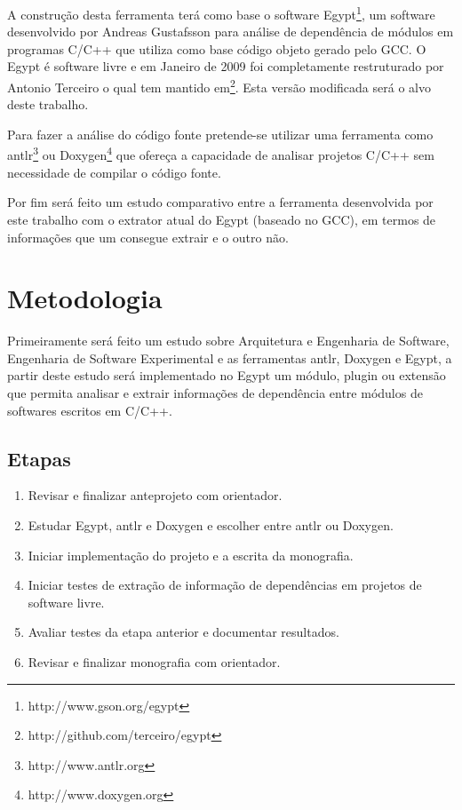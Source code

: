 A construção desta ferramenta terá como base o software
Egypt\footnote{http://www.gson.org/egypt}, um software desenvolvido por Andreas
Gustafsson para análise de dependência de módulos em programas C/C++ que
utiliza como base código objeto gerado pelo GCC. O Egypt é software livre e em
Janeiro de 2009 foi completamente restruturado por Antonio Terceiro o qual tem
mantido em\footnote{http://github.com/terceiro/egypt}. Esta versão modificada
será o alvo deste trabalho.

Para fazer a análise do código fonte pretende-se utilizar uma ferramenta como
antlr\footnote{http://www.antlr.org} ou Doxygen\footnote{http://www.doxygen.org}
que ofereça a capacidade de analisar projetos C/C++ sem necessidade de compilar
o código fonte.

Por fim será feito um estudo comparativo entre a ferramenta desenvolvida por
este trabalho com o extrator atual do Egypt (baseado no GCC), em termos de
informações que um consegue extrair e o outro não.

\chapter{Metodologia}

Primeiramente será feito um estudo sobre Arquitetura e Engenharia de Software,
Engenharia de Software Experimental e as ferramentas antlr, Doxygen e Egypt, a
partir deste estudo será implementado no Egypt um módulo, plugin ou extensão
que permita analisar e extrair informações de dependência entre módulos de
softwares escritos em C/C++.

\section{Etapas}

\begin{enumerate}
\item Revisar e finalizar anteprojeto com orientador.
\item Estudar Egypt, antlr e Doxygen e escolher entre antlr ou Doxygen.
\item Iniciar implementação do projeto e a escrita da monografia.
\item Iniciar testes de extração de informação de dependências em projetos de software livre.
\item Avaliar testes da etapa anterior e documentar resultados.
\item Revisar e finalizar monografia com orientador.
\end{enumerate}

